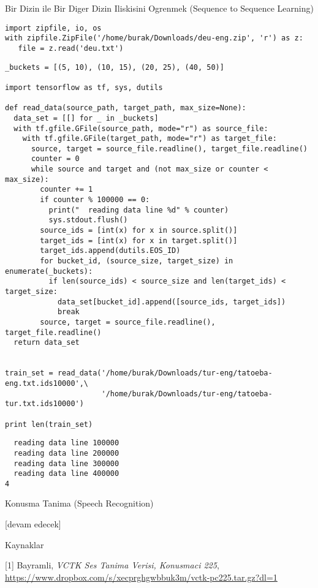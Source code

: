 \documentclass[12pt,fleqn]{article}\usepackage{../../common}
\begin{document}
Bir Dizin ile Bir Diger Dizin Iliskisini Ogrenmek (Sequence to Sequence Learning)

\begin{verbatim}
import zipfile, io, os
with zipfile.ZipFile('/home/burak/Downloads/deu-eng.zip', 'r') as z:
   file = z.read('deu.txt')
\end{verbatim}

\begin{verbatim}
_buckets = [(5, 10), (10, 15), (20, 25), (40, 50)]

import tensorflow as tf, sys, dutils

def read_data(source_path, target_path, max_size=None):
  data_set = [[] for _ in _buckets]
  with tf.gfile.GFile(source_path, mode="r") as source_file:
    with tf.gfile.GFile(target_path, mode="r") as target_file:
      source, target = source_file.readline(), target_file.readline()
      counter = 0
      while source and target and (not max_size or counter < max_size):
        counter += 1
        if counter % 100000 == 0:
          print("  reading data line %d" % counter)
          sys.stdout.flush()
        source_ids = [int(x) for x in source.split()]
        target_ids = [int(x) for x in target.split()]
        target_ids.append(dutils.EOS_ID)
        for bucket_id, (source_size, target_size) in enumerate(_buckets):
          if len(source_ids) < source_size and len(target_ids) < target_size:
            data_set[bucket_id].append([source_ids, target_ids])
            break
        source, target = source_file.readline(), target_file.readline()
  return data_set


train_set = read_data('/home/burak/Downloads/tur-eng/tatoeba-eng.txt.ids10000',\
                      '/home/burak/Downloads/tur-eng/tatoeba-tur.txt.ids10000')

print len(train_set)
\end{verbatim}

\begin{verbatim}
  reading data line 100000
  reading data line 200000
  reading data line 300000
  reading data line 400000
4
\end{verbatim}

















Konusma Tanima (Speech Recognition)












[devam edecek]

Kaynaklar

[1] Bayramli, {\em VCTK Ses Tanima Verisi, Konusmaci 225}, \url{https://www.dropbox.com/s/xecprghgwbbuk3m/vctk-pc225.tar.gz?dl=1}
\end{document}
